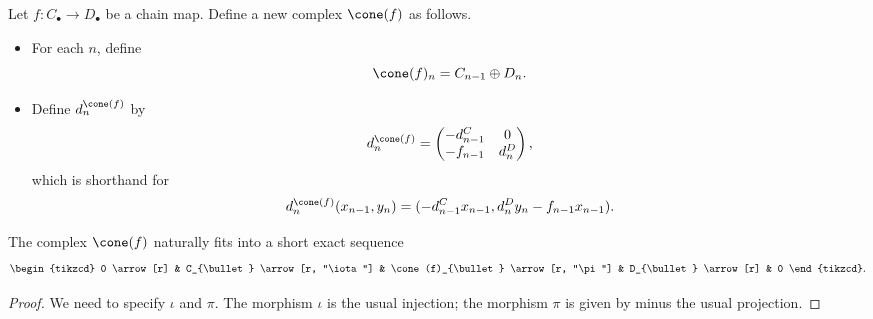 \documentclass[main.tex]{subfiles}
\begin{document}
\begin{definition}
  \label{def:mapping_cone}
  Let $f\colon C_{\bullet} \to D_{\bullet}$ be a chain map. Define a new complex $\cone(f)$ as follows.
  \begin{itemize}
    \item For each $n$, define
      \begin{equation*}
        \cone(f)_{n} = C_{n-1} \oplus D_{n}.
      \end{equation*}

    \item Define $d^{\cone(f)}_{n}$ by
      \begin{equation*}
        d^{\cone(f)}_{n} =
        \begin{pmatrix}
          -d^{C}_{n-1} & 0 \\
          -f_{n-1} & d^{D}_{n}
        \end{pmatrix},
      \end{equation*}
      which is shorthand for
      \begin{equation*}
        d^{\cone(f)}_{n}(x_{n-1}, y_{n}) = (-d^{C}_{n-1}x_{n-1}, d^{D}_{n}y_{n} - f_{n-1}x_{n-1}).
      \end{equation*}
  \end{itemize}
\end{definition}

\begin{lemma}
  \label{lemma:cone_fits_into_ses}
  The complex $\cone(f)$ naturally fits into a short exact sequence
  \begin{equation*}
    \begin{tikzcd}
      0
      \arrow[r]
      & C_{\bullet}
      \arrow[r, "\iota"]
      & \cone(f)_{\bullet}
      \arrow[r, "\pi"]
      & D_{\bullet}
      \arrow[r]
      & 0
    \end{tikzcd}.
  \end{equation*}
\end{lemma}
\begin{proof}
  We need to specify $\iota$ and $\pi$. The morphism $\iota$ is the usual injection; the morphism $\pi$ is given by minus the usual projection.
\end{proof}
\end{document}
